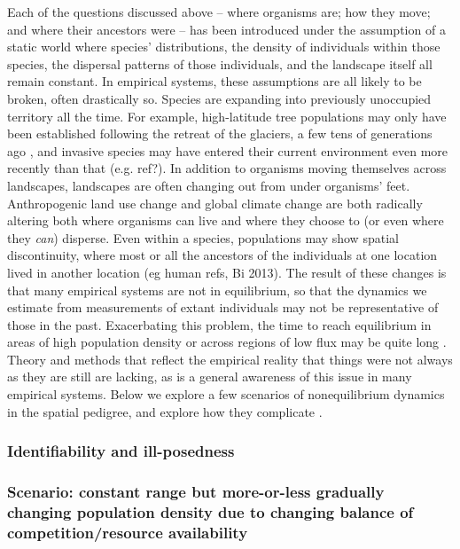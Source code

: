 \documentclass{ar-1col}
\newcommand{\g}[1]{{\color{blue}{#1}}}
\newcommand{\todo}[1]{{\textbf{\color{red}{#1}}}}
\begin{document}
Each of the questions discussed above --
where organisms are;
how they move;
and where their ancestors were
-- has been introduced under the assumption of a static world
where species' distributions,
the density of individuals within those species,
the dispersal patterns of those individuals,
and the landscape itself all remain constant.
In empirical systems,
these assumptions are all likely to be broken,
often drastically so.
Species are expanding into previously unoccupied territory all the time.
For example, 
high-latitude tree populations may only have been established
following the retreat of the glaciers,
a few tens of generations ago \cite{WhitlockMcCauley1999},
and invasive species may have entered their current
environment even more recently than that (e.g. ref?).
In addition to organisms moving themselves across landscapes,
landscapes are often changing out from under organisms' feet.
Anthropogenic land use change
and global climate change
are both radically altering both where organisms can live
and where they choose to
(or even where they \textit{can}) disperse.
Even within a species,
populations may show spatial discontinuity,
where most or all the ancestors of the individuals at one location
lived in another location (eg human refs, Bi 2013).
The result of these changes is that many empirical systems
are not in equilibrium,
so that the dynamics we estimate from
measurements of extant individuals may
not be representative of those in the past.
Exacerbating this problem,
the time to reach equilibrium
in areas of high population density
or across regions of low flux
may be quite long
\cite{WhitlockMcCauley1999, CrowAoki1984, Whitlock1992,Slatkin1993}.
Theory and methods that
reflect the empirical reality that things were not always as they are
still are lacking, 
as is a general awareness of this issue in many empirical systems.
Below we explore a few scenarios of nonequilibrium dynamics
in the spatial pedigree,
and explore how they complicate \g{inference}.

\todo{read through and edit}

\subsubsection{Identifiability and ill-posedness}

\todo{what's the spatiotemporal resolution that you can actually infer things at?  
example: fast pop fluctuations just give you lower Ne}

\subsubsection{Scenario: constant range but more-or-less gradually changing population density due to changing balance of competition/resource availability}
\end{document}
